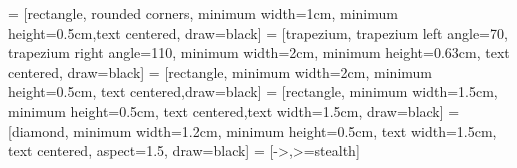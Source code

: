  = [rectangle, rounded corners, minimum width=1cm, minimum height=0.5cm,text centered, draw=black]
 = [trapezium, trapezium left angle=70, trapezium right angle=110, minimum width=2cm, minimum height=0.63cm, text centered, draw=black]
 = [rectangle, minimum width=2cm, minimum height=0.5cm, text centered,draw=black]
 = [rectangle, minimum width=1.5cm, minimum height=0.5cm, text centered,text width=1.5cm, draw=black]
 = [diamond, minimum width=1.2cm, minimum height=0.5cm, text width=1.5cm, text centered, aspect=1.5, draw=black]
 = [->,>=stealth]

\usetikzlibrary{calc,fit}
\usetikzlibrary{fit}

\newcommand{\markline}[1]{%
  \tikz[remember picture,baseline] \node (#1) {};%
}


\usepackage{listings}
\lstset{
  language=Python,
  stepnumber=1,
  numbersep=5pt,
  tabsize=4,
  basicstyle=\scriptsize\ttfamily,
  columns=fullflexible,
  keepspaces,
  showstringspaces=false
}

\newcommand{\RomanNumeralCaps}[1]{\MakeUppercase{\romannumeral #1}}
\usepackage{array}
\newcommand\T{\rule{0pt}{3.4mm}}
\newcommand\B{\rule[-1.5mm]{0pt}{0pt}}
\newcommand{\rnumcap}[1]{\MakeUppercase{\romannumeral #1}}
